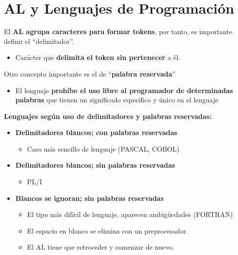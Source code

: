 \documentclass[12pt, twoside, openright]{report} %
\begin{document}
\section{AL y Lenguajes de Programación}

El \textbf{AL agrupa caracteres para formar tokens}, por tanto, es
importante definir el ``delimitador''.

\begin{itemize}

\item
  Carácter que \textbf{delimita el token sin pertenecer} a él.
\end{itemize}

Otro concepto importante es el de ``\textbf{palabra reservada}''

\begin{itemize}

\item
  El lenguaje \textbf{prohíbe el uso libre al programador de
  determinadas palabras} que tienen un significado específico y único en
  el lenguaje
\end{itemize}

\textbf{Lenguajes según uso de delimitadores y palabras reservadas:}

\begin{itemize}

\item
  \textbf{Delimitadores blancos; con palabras reservadas}

  \begin{itemize}
  
  \item
    Caso más sencillo de lenguaje (PASCAL, COBOL)
  \end{itemize}
\item
  \textbf{Delimitadores blancos; sin palabras reservadas}

  \begin{itemize}
  
  \item
    PL/I
  \end{itemize}
\item
  \textbf{Blancos se ignoran; sin palabras reservadas}

  \begin{itemize}
  
  \item
    El tipo más difícil de lenguaje, aparecen ambigüedades (FORTRAN)
  \item
    El espacio en blanco se elimina con un preprocesador.
  \item
    El AL tiene que retroceder y comenzar de nuevo.
  \end{itemize}
\end{itemize}
\end{document}
